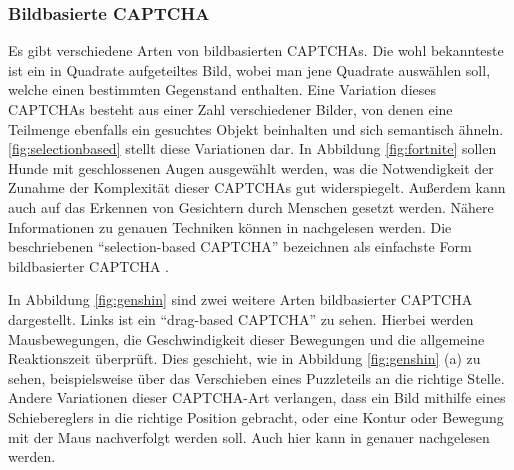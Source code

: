 \subsubsection*{Bildbasierte CAPTCHA}
Es gibt verschiedene Arten von bildbasierten CAPTCHAs. 
Die wohl bekannteste ist ein in Quadrate aufgeteiltes Bild, wobei man jene Quadrate auswählen soll, welche einen bestimmten Gegenstand enthalten.
Eine Variation dieses CAPTCHAs besteht aus einer Zahl verschiedener Bilder, von denen eine Teilmenge ebenfalls ein gesuchtes Objekt beinhalten 
und sich semantisch ähneln. 
\autoref{fig:selectionbased} stellt diese Variationen dar.
In Abbildung \ref{fig:fortnite} sollen Hunde mit geschlossenen Augen ausgewählt werden,
was die Notwendigkeit der Zunahme der Komplexität dieser CAPTCHAs gut widerspiegelt. 
Außerdem kann auch auf das Erkennen von Gesichtern durch Menschen gesetzt werden.
Nähere Informationen zu genauen Techniken können in \cite[p.77ff]{surveyofresearch} nachgelesen werden.
Die beschriebenen ``selection-based CAPTCHA'' bezeichnen \citeauthor{surveyofresearch} als einfachste Form bildbasierter CAPTCHA \cite[p.77]{surveyofresearch}. 

In Abbildung \ref{fig:genshin} sind zwei weitere Arten bildbasierter CAPTCHA dargestellt.
Links ist ein ``drag-based CAPTCHA'' zu sehen.
Hierbei werden Mausbewegungen, die Geschwindigkeit dieser Bewegungen
und die allgemeine Reaktionszeit überprüft.
Dies geschieht, wie in Abbildung \ref{fig:genshin} (a) zu sehen,
beispielsweise über das Verschieben eines Puzzleteils an die richtige Stelle.
Andere Variationen dieser CAPTCHA-Art verlangen, dass ein Bild mithilfe eines Schiebereglers in die richtige Position gebracht,
oder eine Kontur oder Bewegung mit der Maus nachverfolgt werden soll.
Auch hier kann in \cite[p.77]{surveyofresearch} genauer nachgelesen werden.

